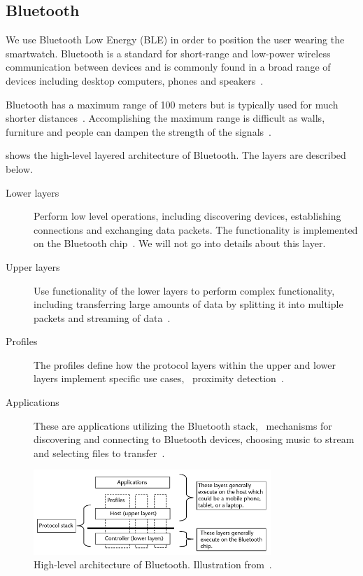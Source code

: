 \subsection{Bluetooth}
\label{sec:analysis:bluetooth}

We use Bluetooth Low Energy (BLE) in order to position the user wearing the smartwatch. Bluetooth is a standard for short-range and low-power wireless communication between devices and is commonly found in a broad range of devices including desktop computers, phones and speakers~\cite{gupta2013inside}.

Bluetooth has a maximum range of 100 meters but is typically used for much shorter distances~\cite[p. 20]{gupta2013inside}. Accomplishing the maximum range is difficult as walls, furniture and people can dampen the strength of the signals~\cite{faragher2014analysis}.

 shows the high-level layered architecture of Bluetooth. The layers are described below.

\begin{description}
\item[Lower layers] Perform low level operations, including discovering devices, establishing connections and exchanging data packets. The functionality is implemented on the Bluetooth chip~\cite[pp. 21-22]{gupta2013inside}. We will not go into details about this layer.
\item[Upper layers] Use functionality of the lower layers to perform complex functionality, including transferring large amounts of data by splitting it into multiple packets and streaming of data~\cite[p. 22]{gupta2013inside}.
\item[Profiles] The profiles define how the protocol layers within the upper and lower layers implement specific use cases, \eg~proximity detection~\cite[p. 22]{gupta2013inside}.
\item[Applications] These are applications utilizing the Bluetooth stack, \eg~mechanisms for discovering and connecting to Bluetooth devices, choosing music to stream and selecting files to transfer~\cite[p. 22]{gupta2013inside}.
\end{description}

\begin{figure}[!htb]
\centering
\includegraphics[width=0.8\textwidth]{images/bluetooth-architecture}
\caption{High-level architecture of Bluetooth. Illustration from~\cite[p. 22]{gupta2013inside}.}
\label{fig:analysis:bluetooth:highlevel-architecture}
\end{figure}

